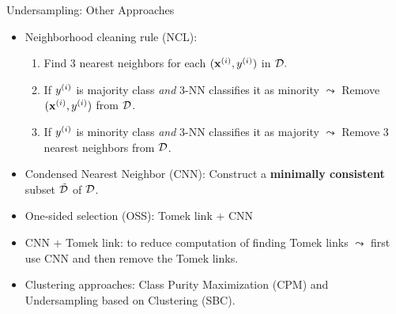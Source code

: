 \documentclass[11pt,compress,t,notes=noshow, xcolor=table]{beamer}
\begin{document}
\begin{frame}{Undersampling: Other Approaches}

    \begin{itemize}

        \item Neighborhood cleaning rule (NCL):
    
        \begin{enumerate}
            
            \item Find 3 nearest neighbors for each $(\mathbf{x}^{(i)},y^{(i)})$ in $\mathcal{D}.$
        
            \item If $y^{(i)}$ is majority class \emph{and} 3-NN classifies it as minority $\leadsto$ Remove $(\mathbf{x}^{(i)},y^{(i)})$ from $\mathcal{D}$.
        
            \item If $y^{(i)}$ is minority class \emph{and} 3-NN classifies it as majority $\leadsto$ Remove 3 nearest neighbors from $\mathcal{D}$.
        
        \end{enumerate} 

    \item Condensed Nearest Neighbor (CNN): Construct a \textbf{minimally consistent} subset $\tilde{\mathcal{D}}$ of $\mathcal{D}$.
        \item One-sided selection (OSS): Tomek link + CNN

        \item CNN + Tomek link: to reduce computation of finding Tomek links $\leadsto$ first use CNN and then remove the Tomek links.
    
        \item Clustering approaches: Class Purity Maximization (CPM) and Undersampling based on Clustering (SBC).

    \end{itemize}

\end{frame}
	


\end{document}
